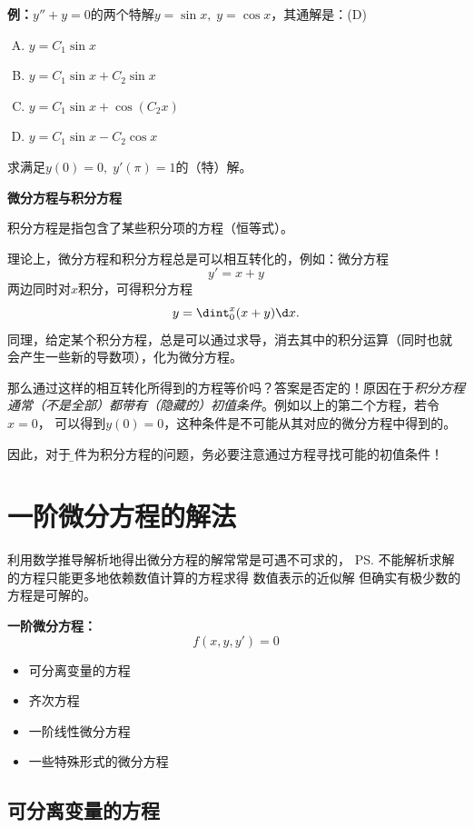 {\bf 例：}$y''+y=0$的两个特解$y=\sin x,\;y=\cos x$，其通解是：(D)
\begin{enumerate}[(A)]
  \setlength{\itemindent}{1cm}
  \item $y=C_1\sin x$
  \item $y=C_1\sin x+C_2\sin x$
  \item $y=C_1\sin x+\cos(C_2x)$
  \item $y=C_1\sin x-C_2\cos x$
\end{enumerate}
求满足$y(0)=0,\;y'(\pi)=1$的（特）解。

\begin{shaded}
	{\bf 微分方程与积分方程}
	
	积分方程是指包含了某些积分项的方程（恒等式）。
	
	理论上，微分方程和积分方程总是可以相互转化的，例如：微分方程
	$$y'=x+y$$
	两边同时对$x$积分，可得积分方程
	$$y=\dint_0^x(x+y)\d x.$$
	同理，给定某个积分方程，总是可以通过求导，消去其中的积分运算（同时也就
	会产生一些新的导数项），化为微分方程。
	
	那么通过这样的相互转化所得到的方程等价吗？答案是否定的！原因在于{\b\it 积分方程
	通常（不是全部）都带有（隐藏的）初值条件}。例如以上的第二个方程，若令$x=0$，
	可以得到$y(0)=0$，这种条件是不可能从其对应的微分方程中得到的。
	
	因此，对于{\b 条件为积分方程的问题，务必要注意通过方程寻找可能的初值条件！}
\end{shaded}

\section{一阶微分方程的解法}

利用数学推导解析地得出微分方程的解常常是可遇不可求的，
\ps{不能解析求解的方程只能更多地依赖数值计算的方程求得
数值表示的近似解}
但确实有极少数的方程是可解的。

{\bf 一阶微分方程：}
$$f(x,y,y')=0$$ 
\begin{itemize}
  \item 可分离变量的方程 
  \item 齐次方程 
  \item 一阶线性微分方程 
  \item 一些特殊形式的微分方程
\end{itemize}

\subsection{可分离变量的方程}

